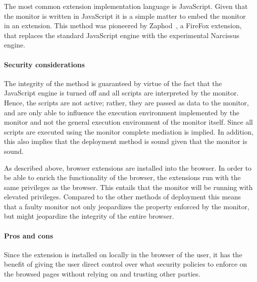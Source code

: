 \documentclass{llncs}
\begin{document}
The most common extension implementation language is JavaScript. Given that
the monitor is written in JavaScript it is a simple matter to embed the 
monitor in an extension.
This method was pioneered by Zaphod~\cite{Zaphod}, a
FireFox extension, that replaces the standard JavaScript engine with the
experimental Narcissus~\cite{Narcissus} engine.


\paragraph{Security considerations}

The integrity of the method is guaranteed by virtue of the fact that the
JavaScript engine is turned off and all scripts are interpreted by the monitor.
Hence, the scripts are not active; rather, they are passed as data to the
monitor, and are only able to influence the execution environment implemented
by the monitor and not the general execution environment of the monitor itself.
Since all scripts are executed using the monitor complete mediation is implied.
In addition, this also implies that the deployment method is sound given that
the monitor is sound. 

As described above, browser extensions are installed into the browser. In order
to be able to enrich the functionality of the browser, the extensions run with
the same privileges as the browser. This entails that the monitor will be
running with elevated privileges. Compared to the other methods of deployment
this means that a faulty monitor not only jeopardizes the property enforced by
the monitor, but might jeopardize the integrity of the entire browser.

\paragraph{Pros and cons}

Since the extension is installed on locally in the browser of the user, it has
the benefit of giving the user direct control over what security policies to 
enforce on the browsed pages without relying on and trusting other parties.
\end{document}
